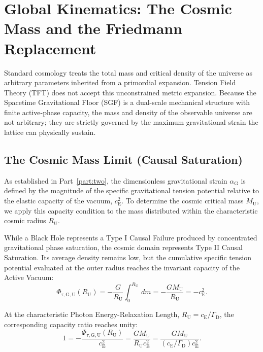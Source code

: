 \chapter{Global Kinematics: The Cosmic Mass and the Friedmann Replacement}
\label{chap:global_kinematics}

Standard cosmology treats the total mass and critical density of the universe as arbitrary parameters inherited from a primordial expansion. Tension Field Theory (TFT) does not accept this unconstrained metric expansion. Because the Spacetime Gravitational Floor (SGF) is a dual-scale mechanical structure with finite active-phase capacity, the mass and density of the observable universe are not arbitrary; they are strictly governed by the maximum gravitational strain the lattice can physically sustain.

\section{The Cosmic Mass Limit (Causal Saturation)}

As established in Part~\ref{part:two}, the dimensionless gravitational strain $\alpha_{\mathrm G}$ is defined by the magnitude of the specific gravitational tension potential relative to the elastic capacity of the vacuum, $c_{\mathrm E}^{2}$. To determine the cosmic critical mass $M_{\mathrm U}$, we apply this capacity condition to the mass distributed within the characteristic cosmic radius $R_{\mathrm U}$.

While a Black Hole represents a Type I Causal Failure produced by concentrated gravitational phase saturation, the cosmic domain represents Type II Causal Saturation. Its average density remains low, but the cumulative specific tension potential evaluated at the outer radius reaches the invariant capacity of the Active Vacuum:
\begin{equation}
    \Phi_{\tau,\mathrm{G,U}}(R_{\mathrm U}) = -\frac{G}{R_{\mathrm U}} \int_{0}^{R_{\mathrm U}} \,dm = -\frac{GM_{\mathrm U}}{R_{\mathrm U}} = -c_{\mathrm E}^{2}.
\end{equation}

At the characteristic Photon Energy-Relaxation Length, $R_{\mathrm U}=c_{\mathrm E}/\Gamma_{\mathrm D}$, the corresponding capacity ratio reaches unity:
\begin{equation}
    1 = -\frac{\Phi_{\tau,\mathrm{G,U}}(R_{\mathrm U})}{c_{\mathrm E}^{2}} = \frac{GM_{\mathrm U}}{R_{\mathrm U}c_{\mathrm E}^{2}} = \frac{GM_{\mathrm U}} {\left(c_{\mathrm E}/\Gamma_{\mathrm D}\right)c_{\mathrm E}^{2}}.
\end{equation}

